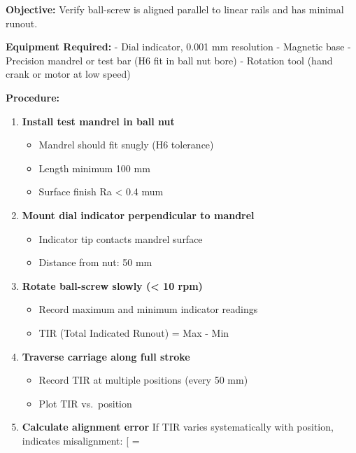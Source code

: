 \documentclass[
]{article}
\providecommand{\tightlist}{%
  \setlength{\itemsep}{0pt}\setlength{\parskip}{0pt}}
\begin{document}
\textbf{Objective:} Verify ball-screw is aligned parallel to linear
rails and has minimal runout.

\textbf{Equipment Required:} - Dial indicator, 0.001 mm resolution -
Magnetic base - Precision mandrel or test bar (H6 fit in ball nut bore)
- Rotation tool (hand crank or motor at low speed)

\textbf{Procedure:}

\begin{enumerate}
\def\labelenumi{\arabic{enumi}.}
\tightlist
\item
  \textbf{Install test mandrel in ball nut}

  \begin{itemize}
  \tightlist
  \item
    Mandrel should fit snugly (H6 tolerance)
  \item
    Length minimum 100 mm
  \item
    Surface finish Ra \textless{} 0.4 mum
  \end{itemize}
\item
  \textbf{Mount dial indicator perpendicular to mandrel}

  \begin{itemize}
  \tightlist
  \item
    Indicator tip contacts mandrel surface
  \item
    Distance from nut: 50 mm
  \end{itemize}
\item
  \textbf{Rotate ball-screw slowly (\textless{} 10 rpm)}

  \begin{itemize}
  \tightlist
  \item
    Record maximum and minimum indicator readings
  \item
    TIR (Total Indicated Runout) = Max - Min
  \end{itemize}
\item
  \textbf{Traverse carriage along full stroke}

  \begin{itemize}
  \tightlist
  \item
    Record TIR at multiple positions (every 50 mm)
  \item
    Plot TIR vs.~position
  \end{itemize}
\item
  \textbf{Calculate alignment error} If TIR varies systematically with
  position, indicates misalignment: {[} =
  \frac{\Delta TIR}{L_{travel}}{]}
\end{enumerate}
\end{document}
